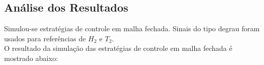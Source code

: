 \documentclass[a0,portrait]{a0poster}
\begin{document}
\begin{multicols}{2}

\color{DarkSlateGray} %

\section*{Análise dos Resultados}

\color{Black}

Simulou-se estratégias de controle em malha fechada. Sinais do tipo degrau foram usados para referências de $H_2$ e $T_2$.\\
\indent O resultado da simulação das estratégias de controle em malha fechada é mostrado abaixo:


\end{multicols}
\end{document}
